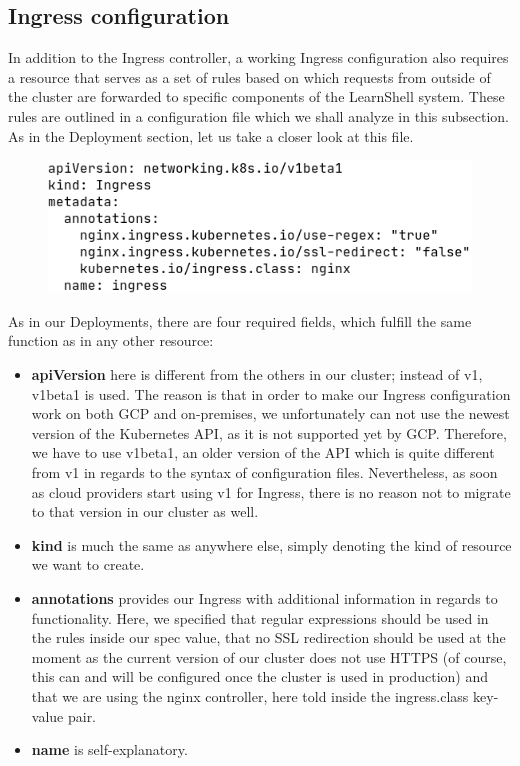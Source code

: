 \documentclass[thesis=B,english]{FITthesis}[2019/12/23]
\begin{document}
\subsection{Ingress configuration}

In addition to the Ingress controller, a working Ingress configuration also requires a resource that serves as a set of rules based on which requests from outside of the cluster are forwarded to specific components of the LearnShell system. These rules are outlined in a configuration file which we shall analyze in this subsection. As in the Deployment section, let us take a closer look at this file.

\begin{figure}[H]
\centering
\hspace*{0.7cm}
\includegraphics[scale=0.5]{kube-ingress1}
\end{figure}

As in our Deployments, there are four required fields, which fulfill the same function as in any other resource:

\begin{itemize}
  \setlength\itemsep{0em}
  \item \textbf{apiVersion} here is different from the others in our cluster; instead of v1, v1beta1 is used. The reason is that in order to make our Ingress configuration work on both GCP and on-premises, we unfortunately can not use the newest version of the Kubernetes API, as it is not supported yet by GCP. Therefore, we have to use v1beta1, an older version of the API which is quite different from v1 in regards to the syntax of configuration files. Nevertheless, as soon as cloud providers start using v1 for Ingress, there is no reason not to migrate to that version in our cluster as well.  
  \item \textbf{kind} is much the same as anywhere else, simply denoting the kind of resource we want to create.
  \item \textbf{annotations} provides our Ingress with additional information in regards to functionality. Here, we specified that regular expressions should be used in the rules inside our spec value, that no SSL redirection should be used at the moment as the current version of our cluster does not use HTTPS (of course, this can and will be configured once the cluster is used in production) and that we are using the nginx controller, here told inside the ingress.class key-value pair.
  \item \textbf{name} is self-explanatory.
\end{itemize}
\end{document}
